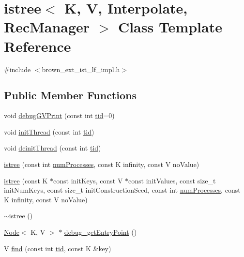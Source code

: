 \hypertarget{classistree}{}\section{istree$<$ K, V, Interpolate, Rec\+Manager $>$ Class Template Reference}
\label{classistree}


{\ttfamily \#include $<$brown\+\_\+ext\+\_\+ist\+\_\+lf\+\_\+impl.\+h$>$}

\subsection*{Public Member Functions}
\begin{DoxyCompactItemize}
\item 
void \hyperlink{classistree_ae75ac218fdeb8c2c24c54688240052c4}{debug\+G\+V\+Print} (const int \hyperlink{microbench_2main_8cpp_a9ca9869868fe7e7a38a921cc7de4103f}{tid}=0)
\item 
void \hyperlink{classistree_a314a70e06f09416a97b49c1046c8872b}{init\+Thread} (const int \hyperlink{microbench_2main_8cpp_a9ca9869868fe7e7a38a921cc7de4103f}{tid})
\item 
void \hyperlink{classistree_a1b35670bfba65ec6133ab502ff8ef89c}{deinit\+Thread} (const int \hyperlink{microbench_2main_8cpp_a9ca9869868fe7e7a38a921cc7de4103f}{tid})
\item 
\hyperlink{classistree_a73f132b3bc40923a0f0b57b9869a1554}{istree} (const int \hyperlink{testing_8cpp_aa085812188e21ede75351d88b9b2c30d}{num\+Processes}, const K infinity, const V no\+Value)
\item 
\hyperlink{classistree_a855f1a8a6458f6db1153b1188cd6f4be}{istree} (const K $\ast$const init\+Keys, const V $\ast$const init\+Values, const size\+\_\+t init\+Num\+Keys, const size\+\_\+t init\+Construction\+Seed, const int \hyperlink{testing_8cpp_aa085812188e21ede75351d88b9b2c30d}{num\+Processes}, const K infinity, const V no\+Value)
\item 
\hyperlink{classistree_a2bc6843d8584242a5cb5de0eaa30310c}{$\sim$istree} ()
\item 
\hyperlink{classNode}{Node}$<$ K, V $>$ $\ast$ \hyperlink{classistree_ae4fe2d0a0344a0bc5c111707060cd54e}{debug\+\_\+get\+Entry\+Point} ()
\item 
V \hyperlink{classistree_aea29ccbfa17b8a91ab55683c2269bb1a}{find} (const int \hyperlink{microbench_2main_8cpp_a9ca9869868fe7e7a38a921cc7de4103f}{tid}, const K \&key)
\item 

\end{DoxyCompactItemize}
